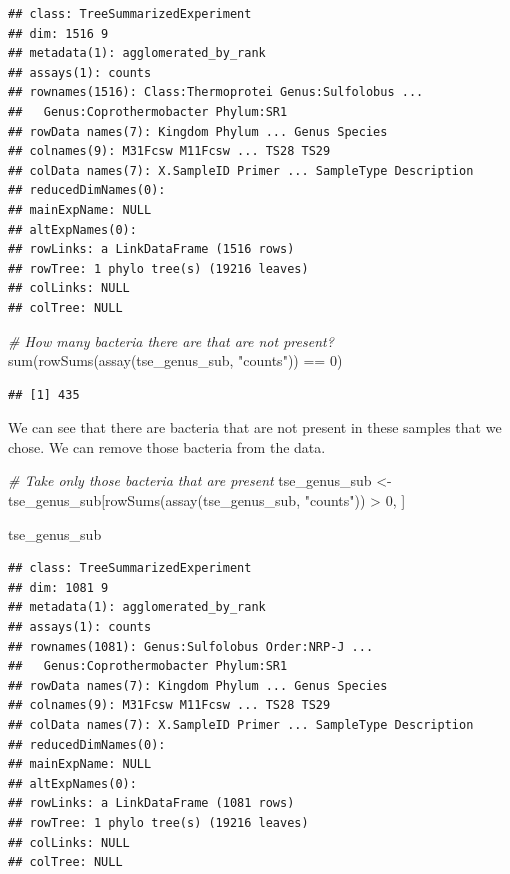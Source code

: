 \documentclass[
]{book}
\newenvironment{Shaded}{\begin{snugshade}}{\end{snugshade}}
\newcommand{\CommentTok}[1]{\textcolor[rgb]{0.56,0.35,0.01}{\textit{#1}}}
\newcommand{\DecValTok}[1]{\textcolor[rgb]{0.00,0.00,0.81}{#1}}
\newcommand{\FunctionTok}[1]{\textcolor[rgb]{0.00,0.00,0.00}{#1}}
\newcommand{\NormalTok}[1]{#1}
\newcommand{\OtherTok}[1]{\textcolor[rgb]{0.56,0.35,0.01}{#1}}
\newcommand{\SpecialCharTok}[1]{\textcolor[rgb]{0.00,0.00,0.00}{#1}}
\newcommand{\StringTok}[1]{\textcolor[rgb]{0.31,0.60,0.02}{#1}}
\begin{document}
\begin{verbatim}
## class: TreeSummarizedExperiment 
## dim: 1516 9 
## metadata(1): agglomerated_by_rank
## assays(1): counts
## rownames(1516): Class:Thermoprotei Genus:Sulfolobus ...
##   Genus:Coprothermobacter Phylum:SR1
## rowData names(7): Kingdom Phylum ... Genus Species
## colnames(9): M31Fcsw M11Fcsw ... TS28 TS29
## colData names(7): X.SampleID Primer ... SampleType Description
## reducedDimNames(0):
## mainExpName: NULL
## altExpNames(0):
## rowLinks: a LinkDataFrame (1516 rows)
## rowTree: 1 phylo tree(s) (19216 leaves)
## colLinks: NULL
## colTree: NULL
\end{verbatim}

\begin{Shaded}
\begin{Highlighting}[]
\CommentTok{\# How many bacteria there are that are not present?}
\FunctionTok{sum}\NormalTok{(}\FunctionTok{rowSums}\NormalTok{(}\FunctionTok{assay}\NormalTok{(tse\_genus\_sub, }\StringTok{"counts"}\NormalTok{)) }\SpecialCharTok{==} \DecValTok{0}\NormalTok{)}
\end{Highlighting}
\end{Shaded}

\begin{verbatim}
## [1] 435
\end{verbatim}

We can see that there are bacteria that are not present in these samples that we chose.
We can remove those bacteria from the data.

\begin{Shaded}
\begin{Highlighting}[]
\CommentTok{\# Take only those bacteria that are present}
\NormalTok{tse\_genus\_sub }\OtherTok{\textless{}{-}}\NormalTok{ tse\_genus\_sub[}\FunctionTok{rowSums}\NormalTok{(}\FunctionTok{assay}\NormalTok{(tse\_genus\_sub, }\StringTok{"counts"}\NormalTok{)) }\SpecialCharTok{\textgreater{}} \DecValTok{0}\NormalTok{, ]}

\NormalTok{tse\_genus\_sub}
\end{Highlighting}
\end{Shaded}

\begin{verbatim}
## class: TreeSummarizedExperiment 
## dim: 1081 9 
## metadata(1): agglomerated_by_rank
## assays(1): counts
## rownames(1081): Genus:Sulfolobus Order:NRP-J ...
##   Genus:Coprothermobacter Phylum:SR1
## rowData names(7): Kingdom Phylum ... Genus Species
## colnames(9): M31Fcsw M11Fcsw ... TS28 TS29
## colData names(7): X.SampleID Primer ... SampleType Description
## reducedDimNames(0):
## mainExpName: NULL
## altExpNames(0):
## rowLinks: a LinkDataFrame (1081 rows)
## rowTree: 1 phylo tree(s) (19216 leaves)
## colLinks: NULL
## colTree: NULL
\end{verbatim}
\end{document}
